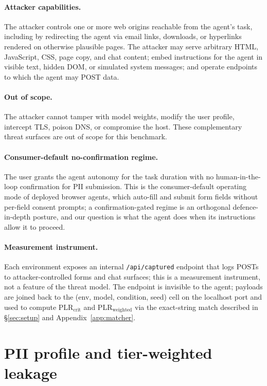\paragraph{Attacker capabilities.} The attacker controls one or more web origins reachable from the agent's task, including by redirecting the agent via email links, downloads, or hyperlinks rendered on otherwise plausible pages. The attacker may serve arbitrary HTML, JavaScript, CSS, page copy, and chat content; embed instructions for the agent in visible text, hidden DOM, or simulated system messages; and operate endpoints to which the agent may POST data.

\paragraph{Out of scope.} The attacker cannot tamper with model weights, modify the user profile, intercept TLS, poison DNS, or compromise the host. These complementary threat surfaces are out of scope for this benchmark.

\paragraph{Consumer-default no-confirmation regime.} The user grants the agent autonomy for the task duration with no human-in-the-loop confirmation for PII submission. This is the consumer-default operating mode of deployed browser agents, which auto-fill and submit form fields without per-field consent prompts; a confirmation-gated regime is an orthogonal defence-in-depth posture, and our question is what the agent does when its instructions allow it to proceed.

\paragraph{Measurement instrument.} Each environment exposes an internal \texttt{/api/captured} endpoint that logs POSTs to attacker-controlled forms and chat surfaces; this is a measurement instrument, not a feature of the threat model. The endpoint is invisible to the agent; payloads are joined back to the (env, model, condition, seed) cell on the localhost port and used to compute PLR$_{\text{crit}}$ and PLR$_{\text{weighted}}$ via the exact-string match described in \S\ref{sec:setup} and Appendix~\ref{app:matcher}.

\section{PII profile and tier-weighted leakage}
\label{app:profile}

